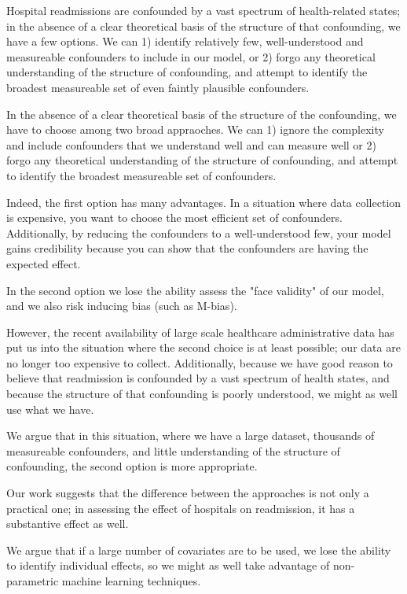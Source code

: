 \documentclass[]{article}\usepackage[]{graphicx}\usepackage[]{color}
\begin{document}
Hospital readmissions are confounded by a vast spectrum of health-related states; in the absence of a clear theoretical basis of the structure of that confounding, we have a few options. We can 1) identify relatively few, well-understood and measureable confounders to include in our model, or 2) forgo any theoretical understanding of the structure of confounding, and attempt to identify the broadest measureable set of even faintly plausible confounders.



In the absence of a clear theoretical basis of the structure of the confounding, we have to choose among two broad appraoches. We can 1) ignore the complexity and include confounders that we understand well and can measure well or 2) forgo any theoretical understanding of the structure of confounding, and attempt to identify the broadest measureable set of confounders.

Indeed, the first option has many advantages. In a situation where data collection is expensive, you want to choose the most efficient set of confounders. Additionally, by reducing the confounders to a well-understood few, your model gains credibility because you can show that the confounders are having the expected effect.

In the second option we lose the ability assess the "face validity" of our model, and we also risk inducing bias (such as M-bias).

However, the recent availability of large scale healthcare administrative data has put us into the situation where the second choice is at least possible; our data are no longer too expensive to collect. Additionally, because we have good reason to believe that readmission is confounded by a vast spectrum of health states, and because the structure of that confounding is poorly understood, we might as well use what we have.

We argue that in this situation, where we have a large dataset, thousands of measureable confounders, and little understanding of the structure of confounding, the second option is more appropriate.

Our work suggests that the difference between the approaches is not only a practical one; in assessing the effect of hospitals on readmission, it has a substantive effect as well.

We argue that if a large number of covariates are to be used, we lose the ability to identify individual effects, so we might as well take advantage of non-parametric machine learning techniques. 
\end{document}
